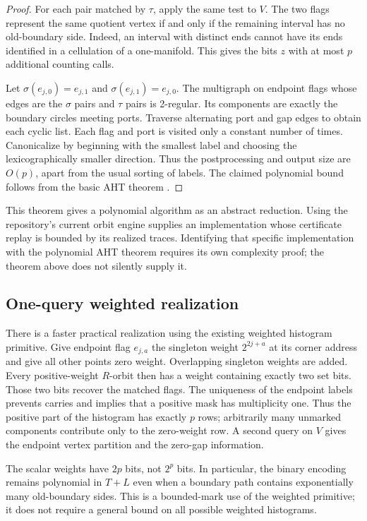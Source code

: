 \begin{proof}
For each pair matched by $\tau$, apply the same test to $V$.  The two flags
represent the same quotient vertex if and only if the remaining interval
has no old-boundary side.  Indeed, an interval with distinct ends cannot
have its ends identified in a cellulation of a one-manifold.  This gives
the bits $z$ with at most $p$ additional counting calls.

Let $\sigma(e_{j,0})=e_{j,1}$ and
$\sigma(e_{j,1})=e_{j,0}$.  The multigraph on endpoint flags whose edges
are the $\sigma$ pairs and $\tau$ pairs is 2-regular.  Its components are
exactly the boundary circles meeting ports.  Traverse alternating port
and gap edges to obtain each cyclic list.  Each flag and port is visited
only a constant number of times.  Canonicalize by beginning with the
smallest label and choosing the lexicographically smaller direction.
Thus the postprocessing and output size are $O(p)$, apart from the usual
sorting of labels.  The claimed polynomial bound follows from the basic
AHT theorem \cite{AHT2006}.
\end{proof}

This theorem gives a polynomial algorithm as an abstract reduction.
Using the repository's current orbit engine supplies an implementation
whose certificate replay is bounded by its realized traces.  Identifying
that specific implementation with the polynomial AHT theorem requires
its own complexity proof; the theorem above does not silently supply it.

\subsection{One-query weighted realization}

There is a faster practical realization using the existing weighted
histogram primitive.  Give endpoint flag $e_{j,a}$ the singleton weight
$2^{2j+a}$ at its corner address and give all other points zero weight.
Overlapping singleton weights are added.  Every positive-weight $R$-orbit
then has a weight containing exactly two set bits.  Those two bits recover
the matched flags.  The uniqueness of the endpoint labels prevents carries
and implies that a positive mask has multiplicity one.  Thus the positive
part of the histogram has exactly $p$ rows; arbitrarily many unmarked
components contribute only to the zero-weight row.  A second query on $V$
gives the endpoint vertex partition and the zero-gap information.

The scalar weights have $2p$ bits, not $2^p$ bits.  In particular, the
binary encoding remains polynomial in $T+L$ even when a boundary path
contains exponentially many old-boundary sides.  This is a bounded-mark
use of the weighted primitive; it does not require a general bound on
all possible weighted histograms.

